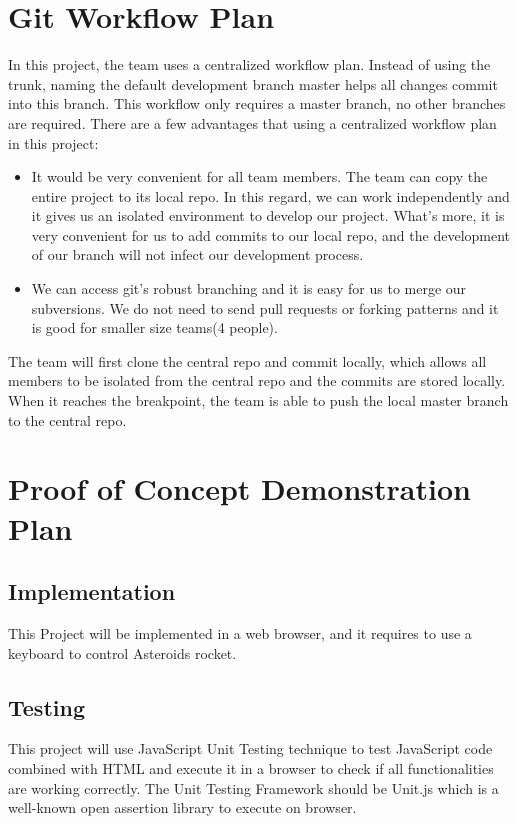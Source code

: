 \documentclass{article}
\begin{document}
\section{Git Workflow Plan}
In this project, the team uses a centralized workflow plan. Instead of using the trunk, naming the default development branch master helps all changes commit into this branch. This workflow only requires a master branch, no other branches are required. There are a few advantages that using a centralized workflow plan in this project:

\begin{itemize}
  \item It would be very convenient for all team members. The team can copy the entire project to its local repo. In this regard, we can work independently and it gives us an isolated environment to develop our project. What's more, it is very convenient for us to add commits to our local repo, and the development of our branch will not infect our development process.
  \item We can access git's robust branching and it is easy for us to merge our subversions. We do not need to send pull requests or forking patterns and it is good for smaller size teams(4 people).
\end{itemize}

The team will first clone the central repo and commit locally, which allows all members to be isolated from the central repo and the commits are stored locally. When it reaches the breakpoint, the team is able to push the local master branch to the central repo.
\section{Proof of Concept Demonstration Plan}
\subsection{Implementation}
This Project will be implemented in a web browser, and it requires to use a keyboard to control Asteroids rocket.
\subsection{Testing}
This project will use JavaScript Unit Testing technique to test JavaScript code combined with HTML and execute it in a browser to check if all functionalities are working correctly. The Unit Testing Framework should be Unit.js which is a well-known open assertion library to execute on browser. 
\end{document}
